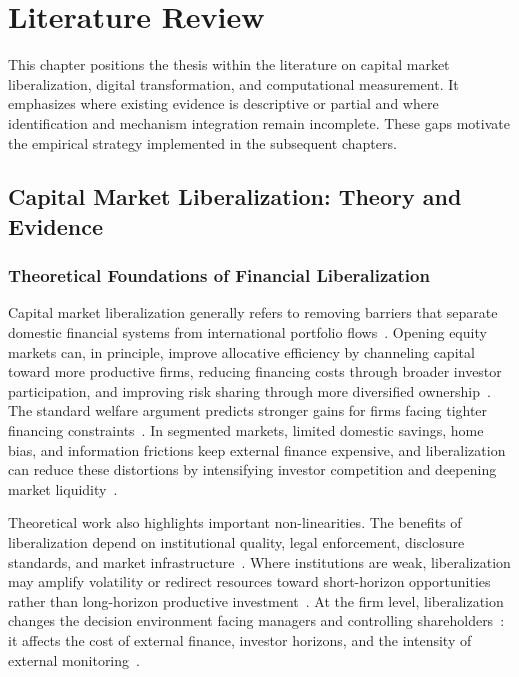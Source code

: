 \chapter{Literature Review}
\label{chap:literature_review}

This chapter positions the thesis within the literature on capital market liberalization, digital transformation, and computational measurement. It emphasizes where existing evidence is descriptive or partial and where identification and mechanism integration remain incomplete. These gaps motivate the empirical strategy implemented in the subsequent chapters.

\section{Capital Market Liberalization: Theory and Evidence}

\subsection{Theoretical Foundations of Financial Liberalization}

Capital market liberalization generally refers to removing barriers that separate domestic financial systems from international portfolio flows~\cite{Long2024}. Opening equity markets can, in principle, improve allocative efficiency by channeling capital toward more productive firms, reducing financing costs through broader investor participation, and improving risk sharing through more diversified ownership~\cite{Zhu2023}. The standard welfare argument predicts stronger gains for firms facing tighter financing constraints~\cite{Yin2023}. In segmented markets, limited domestic savings, home bias, and information frictions keep external finance expensive, and liberalization can reduce these distortions by intensifying investor competition and deepening market liquidity~\cite{HLiu2024}.

Theoretical work also highlights important non-linearities. The benefits of liberalization depend on institutional quality, legal enforcement, disclosure standards, and market infrastructure~\cite{Stiglitz2004}. Where institutions are weak, liberalization may amplify volatility or redirect resources toward short-horizon opportunities rather than long-horizon productive investment~\cite{JXZhang2023}. At the firm level, liberalization changes the decision environment facing managers and controlling shareholders~\cite{ChengMasron2023}: it affects the cost of external finance, investor horizons, and the intensity of external monitoring~\cite{Chen2025}.


